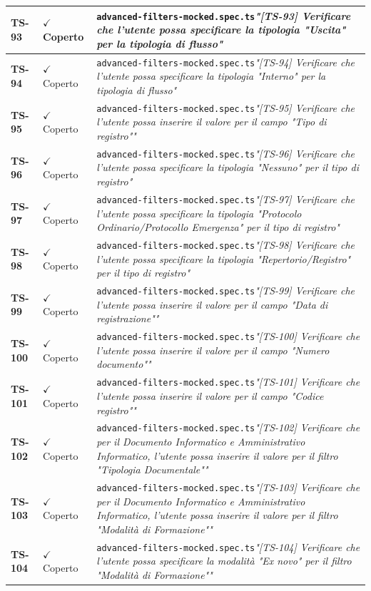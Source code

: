 \documentclass[a4paper,12pt]{article}
\newcommand{\ok}{\textcolor{green!60!black}{$\checkmark$ Coperto}}
\newcommand{\f}[1]{\nolinkurl{#1}\newline}
\newcommand{\q}[1]{\textit{#1}}
\begin{document}
\begin{longtable}{|p{1.5cm}|p{3.0cm}|p{10.5cm}|}
\textbf{TS-93} & \ok & \f{advanced-filters-mocked.spec.ts}\q{"[TS-93] Verificare che l'utente possa specificare la tipologia "Uscita" per la tipologia di flusso"} \\ \hline
\textbf{TS-94} & \ok & \f{advanced-filters-mocked.spec.ts}\q{"[TS-94] Verificare che l'utente possa specificare la tipologia "Interno" per la tipologia di flusso"} \\ \hline
\textbf{TS-95} & \ok & \f{advanced-filters-mocked.spec.ts}\q{"[TS-95] Verificare che l'utente possa inserire il valore per il campo "Tipo di registro""} \\ \hline
\textbf{TS-96} & \ok & \f{advanced-filters-mocked.spec.ts}\q{"[TS-96] Verificare che l'utente possa specificare la tipologia "Nessuno" per il tipo di registro"} \\ \hline
\textbf{TS-97} & \ok & \f{advanced-filters-mocked.spec.ts}\q{"[TS-97] Verificare che l'utente possa specificare la tipologia "Protocolo Ordinario/Protocollo Emergenza" per il tipo di registro"} \\ \hline
\textbf{TS-98} & \ok & \f{advanced-filters-mocked.spec.ts}\q{"[TS-98] Verificare che l'utente possa specificare la tipologia "Repertorio/Registro" per il tipo di registro"} \\ \hline
\textbf{TS-99} & \ok & \f{advanced-filters-mocked.spec.ts}\q{"[TS-99] Verificare che l'utente possa inserire il valore per il campo "Data di registrazione""} \\ \hline
\textbf{TS-100} & \ok & \f{advanced-filters-mocked.spec.ts}\q{"[TS-100] Verificare che l'utente possa inserire il valore per il campo "Numero documento""} \\ \hline
\textbf{TS-101} & \ok & \f{advanced-filters-mocked.spec.ts}\q{"[TS-101] Verificare che l'utente possa inserire il valore per il campo "Codice registro""} \\ \hline
\textbf{TS-102} & \ok & \f{advanced-filters-mocked.spec.ts}\q{"[TS-102] Verificare che per il Documento Informatico e Amministrativo Informatico, l'utente possa inserire il valore per il filtro "Tipologia Documentale""} \\ \hline
\textbf{TS-103} & \ok & \f{advanced-filters-mocked.spec.ts}\q{"[TS-103] Verificare che per il Documento Informatico e Amministrativo Informatico, l'utente possa inserire il valore per il filtro "Modalità di Formazione""} \\ \hline
\textbf{TS-104} & \ok & \f{advanced-filters-mocked.spec.ts}\q{"[TS-104] Verificare che l'utente possa specificare la modalità "Ex novo" per il filtro "Modalità di Formazione""} \\ \hline

\end{longtable}
\end{document}
